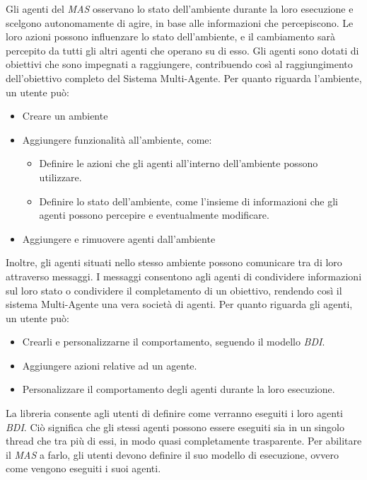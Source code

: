 Gli agenti del \textit{MAS} osservano lo stato dell'ambiente durante la loro esecuzione e scelgono autonomamente di agire, in base alle informazioni che percepiscono. Le loro azioni possono influenzare lo stato dell'ambiente, e il cambiamento sarà percepito da tutti gli altri agenti che operano su di esso. Gli agenti sono dotati di obiettivi che sono impegnati a raggiungere, contribuendo così al raggiungimento dell'obiettivo completo del Sistema Multi-Agente. Per quanto riguarda l'ambiente, un utente può:

\begin{itemize}
    \item Creare un ambiente
    \item Aggiungere funzionalità all'ambiente, come:
    \begin{itemize}
        \item Definire le azioni che gli agenti all'interno dell'ambiente possono utilizzare.
        \item Definire lo stato dell'ambiente, come l'insieme di informazioni che gli agenti possono percepire e eventualmente modificare.
    \end{itemize}
    \item Aggiungere e rimuovere agenti dall'ambiente
\end{itemize}

Inoltre, gli agenti situati nello stesso ambiente possono comunicare tra di loro attraverso messaggi. I messaggi consentono agli agenti di condividere informazioni sul loro stato o condividere il completamento di un obiettivo, rendendo così il sistema Multi-Agente una vera società di agenti. Per quanto riguarda gli agenti, un utente può:

\begin{itemize}
    \item Crearli e personalizzarne il comportamento, seguendo il modello \textit{BDI}.
    \item Aggiungere azioni relative ad un agente.
    \item Personalizzare il comportamento degli agenti durante la loro esecuzione.
\end{itemize}

La libreria consente agli utenti di definire come verranno eseguiti i loro agenti \textit{BDI}. Ciò significa che gli stessi agenti possono essere eseguiti sia in un singolo thread che tra più di essi, in modo quasi completamente trasparente. Per abilitare il \textit{MAS} a farlo, gli utenti devono definire il suo modello di esecuzione, ovvero come vengono eseguiti i suoi agenti.


